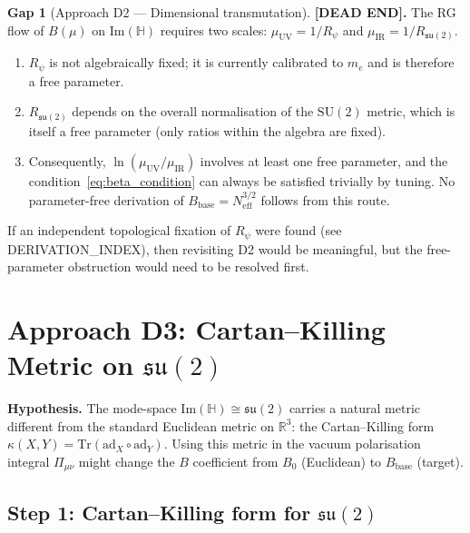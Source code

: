 \documentclass[11pt,a4paper]{article}
\theoremstyle{definition}
\newtheorem{gap}{Gap}
\theoremstyle{remark}
\begin{document}
\begin{gap}[Approach D2 — Dimensional transmutation]
\label{gap:D2}
  \textbf{[DEAD END].}
  The RG flow of $B(\mu)$ on $\mathrm{Im}(\mathbb{H})$ requires two scales:
  $\mu_{\mathrm{UV}} = 1/R_\psi$ and $\mu_{\mathrm{IR}} = 1/R_{\mathfrak{su}(2)}$.
  \begin{enumerate}
    \item[(i)] $R_\psi$ is not algebraically fixed; it is currently calibrated to $m_e$
      and is therefore a free parameter.
    \item[(ii)] $R_{\mathfrak{su}(2)}$ depends on the overall normalisation of the
      $\mathrm{SU}(2)$ metric, which is itself a free parameter (only ratios within
      the algebra are fixed).
    \item[(iii)] Consequently, $\ln(\mu_{\mathrm{UV}}/\mu_{\mathrm{IR}})$ involves at
      least one free parameter, and the condition~\eqref{eq:beta_condition}
      can always be satisfied trivially by tuning.
      No parameter-free derivation of $B_{\mathrm{base}} = N_{\mathrm{eff}}^{3/2}$
      follows from this route.
  \end{enumerate}
  If an independent topological fixation of $R_\psi$ were found (see DERIVATION\_INDEX),
  then revisiting D2 would be meaningful, but the free-parameter obstruction would
  need to be resolved first.
\end{gap}

\section{Approach D3: Cartan--Killing Metric on $\mathfrak{su}(2)$}
\label{sec:D3_cartan_killing}

\textbf{Hypothesis.}
The mode-space $\mathrm{Im}(\mathbb{H}) \cong \mathfrak{su}(2)$ carries a natural metric
different from the standard Euclidean metric on $\mathbb{R}^3$: the Cartan--Killing
form $\kappa(X,Y) = \mathrm{Tr}(\mathrm{ad}_X \circ \mathrm{ad}_Y)$.
Using this metric in the vacuum polarisation integral $\Pi_{\mu\nu}$ might change the
$B$ coefficient from $B_0$ (Euclidean) to $B_{\mathrm{base}}$ (target).

\subsection{Step 1: Cartan--Killing form for $\mathfrak{su}(2)$}
\end{document}
